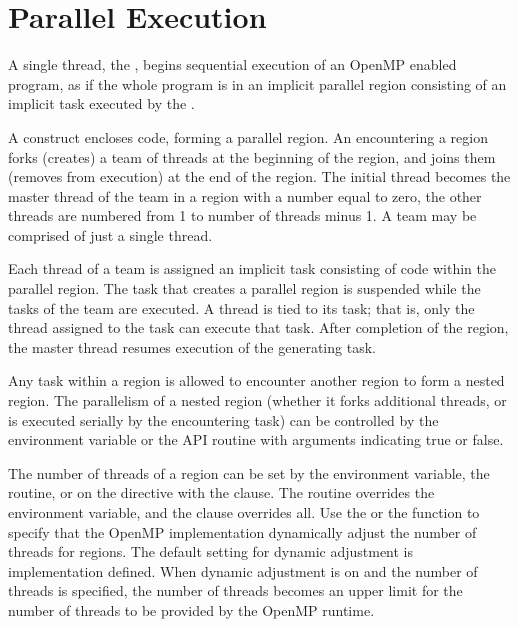 \pagebreak
\chapter{Parallel Execution}
\label{chap:parallel_execution}

A single thread, the , begins sequential execution of 
an OpenMP enabled program, as if the whole program is in an implicit parallel
region consisting of an implicit task executed by the .

A  construct encloses code, 
forming a parallel region.  An  encountering a  
region forks (creates) a team of threads at the beginning of the 
 region, and joins them (removes from execution) at the 
end of the region.  The initial thread becomes the master thread of the team in a 
 region with a  number equal to zero, the other 
threads are numbered from 1 to number of threads minus 1. 
A team may be comprised of just a single thread.

Each thread of a team is assigned an implicit task consisting of code within the 
parallel region. The task that creates a parallel region is suspended while the
tasks of the team are executed.  A thread is tied to its task; that is,
only the thread assigned to the task can execute that task.  After completion 
of the  region, the master thread resumes execution of the generating task.  


Any task within a  region is allowed to encounter another
 region to form a nested  region. The 
parallelism of a nested  region (whether it forks additional 
threads, or is executed serially by the encountering task) can be controlled by the
 environment variable or the  
API routine with arguments indicating true or false.

The number of threads of a  region can be set by the 
environment variable, the  routine, or on the  
directive with the 
clause. The routine overrides the environment variable, and the clause overrides all. 
Use the 
or the  function to specify that the OpenMP
implementation dynamically adjust the number of threads for
 regions.  The default setting for dynamic adjustment is implementation
defined. When dynamic adjustment is on and the number of threads is specified,
the number of threads becomes an upper limit for the number of threads to be
provided by the OpenMP runtime.

